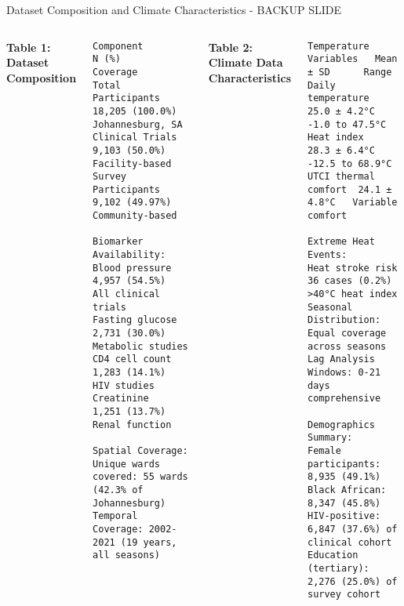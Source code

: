 \documentclass[10pt,aspectratio=169]{beamer}
\begin{document}
\begin{frame}[fragile]{Dataset Composition and Climate Characteristics - BACKUP SLIDE}
\footnotesize
\begin{columns}[T]
\textbf{Table 1: Dataset Composition}
\begin{verbatim}
Component               N (%)        Coverage
Total Participants    18,205 (100.0%)  Johannesburg, SA
Clinical Trials        9,103 (50.0%)   Facility-based
Survey Participants    9,102 (49.97%)  Community-based

Biomarker Availability:
Blood pressure         4,957 (54.5%)   All clinical trials
Fasting glucose        2,731 (30.0%)   Metabolic studies
CD4 cell count         1,283 (14.1%)   HIV studies
Creatinine            1,251 (13.7%)   Renal function

Spatial Coverage:
Unique wards covered: 55 wards (42.3% of Johannesburg)
Temporal Coverage: 2002-2021 (19 years, all seasons)
\end{verbatim}

\textbf{Table 2: Climate Data Characteristics}
\begin{verbatim}
Temperature Variables   Mean ± SD      Range
Daily temperature      25.0 ± 4.2°C   -1.0 to 47.5°C
Heat index            28.3 ± 6.4°C   -12.5 to 68.9°C
UTCI thermal comfort  24.1 ± 4.8°C   Variable comfort

Extreme Heat Events:
Heat stroke risk      36 cases (0.2%)  >40°C heat index
Seasonal Distribution: Equal coverage across seasons
Lag Analysis Windows: 0-21 days comprehensive

Demographics Summary:
Female participants: 8,935 (49.1%)
Black African: 8,347 (45.8%)
HIV-positive: 6,847 (37.6%) of clinical cohort
Education (tertiary): 2,276 (25.0%) of survey cohort
\end{verbatim}
\end{columns}
\end{frame}
\end{document}
